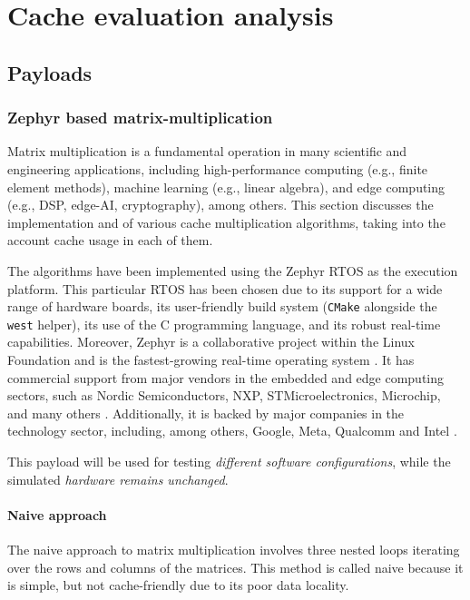 
\chapter{Cache evaluation analysis}

\section{Payloads}

\subsection{Zephyr based matrix-multiplication}

Matrix multiplication is a fundamental operation in many scientific and engineering applications, including high-performance computing (e.g., finite element methods), machine
learning (e.g., linear algebra), and edge computing (e.g., DSP, edge-AI, cryptography), among others. This section discusses the implementation and of various cache multiplication algorithms,
taking into the account cache usage in each of them.

The algorithms have been implemented using the Zephyr RTOS as the execution platform. This particular RTOS has been chosen due to its support for a wide range of hardware boards,
its user-friendly build system (\texttt{CMake} alongside the \texttt{west} helper), its use of the C programming language, and its robust real-time capabilities.
Moreover, Zephyr is a collaborative project within the Linux Foundation and is the fastest-growing real-time operating system \cite{zephyrlotsofcommits}. It has commercial support
from major vendors in the embedded and edge computing sectors, such as Nordic Semiconductors, NXP, STMicroelectronics, Microchip, and many others \cite{aboutzephyr}. Additionally,
it is backed by major companies in the technology sector, including, among others, Google, Meta, Qualcomm and Intel \cite{zephyrmetagoogle, zephyrmembers}.

\noindent This payload will be used for testing \textit{different software configurations}, while the simulated \textit{hardware remains unchanged}.

\subsubsection*{Naive approach} \label{sec:mmnaive}
The naive approach to matrix multiplication involves three nested loops iterating over the rows and columns of the matrices. This method is called naive because it is simple, but not cache-friendly
due to its poor data locality.

